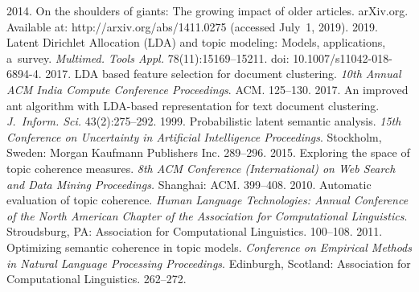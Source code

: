     



\vspace*{8pt}

 \begin{multicols}{2}

\renewcommand{\bibname}{\protect\rmfamily References}

{\small\frenchspacing
 {%
 \begin{thebibliography}{99}
 2014. On the shoulders of giants: The growing impact of older articles. 
 arXiv.org. Available at: 
 {\sf http://arxiv.org/abs/1411.0275} (accessed July~1, 2019).
2019. Latent Dirichlet Allocation (LDA) and topic modeling: 
Models, applications, a~survey. 
\textit{Multimed. Tools  Appl.} 78(11):15169--15211. 
doi: 10.1007/s11042-018-6894-4.
 2017. LDA based feature selection for document clustering. 
 \textit{10th Annual ACM India Compute Conference Proceedings}. ACM. 125--130.
 2017. An improved ant algorithm with LDA-based representation for
  text document clustering. \textit{J.~Inform. Sci.} 43(2):275--292.
 1999. Probabilistic latent semantic analysis. 
 \textit{15th Conference on Uncertainty in Artificial Intelligence
 Proceedings}. Stockholm, Sweden: Morgan Kaufmann Publishers Inc. 289--296.
 2015. Exploring the space of topic coherence measures. 
 \textit{8th ACM Conference (International) on Web Search and Data 
 Mining Proceedings.} Shanghai: ACM. 399--408.
 2010. Automatic evaluation of topic coherence. 
 \textit{Human Language Technologies: Annual Conference 
 of the North American Chapter of the Association for Computational 
 Linguistics}. Stroudsburg, PA:
 Association for Computational Linguistics. 100--108.
 2011.
 Optimizing semantic coherence in topic models. 
 \textit{Conference on Empirical Methods in Natural Language Processing
 Proceedings}. Edinburgh, Scotland: 
 Association for Computational Linguistics. 262--272.
 

\end{thebibliography}}}
\end{multicols}
